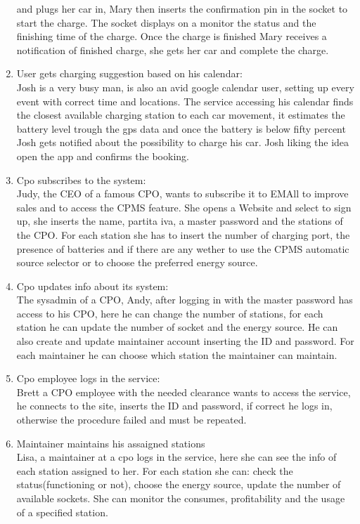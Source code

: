 \begin{enumerate}[label=S\arabic*]
            and plugs her car in, Mary then inserts the confirmation pin in the socket to start the charge.
            The socket displays on a monitor the status and the finishing time of the charge.
            Once the charge is finished Mary receives a notification of finished charge,
            she gets her car and complete the charge.
      \item User gets charging suggestion based on his calendar:\\
            Josh is a very busy man, is also an avid google calendar user,
            setting up every event with correct time and locations.
            The service accessing his calendar finds the closest available charging station to each car movement,
            it estimates the battery level trough the gps data and once the battery is below fifty percent Josh gets notified
            about the possibility to charge his car.
            Josh liking the idea open the app and confirms the booking.
      \item Cpo subscribes to the system:\\
            Judy, the CEO of a famous CPO, wants to subscribe it to EMAll to improve sales and to access the CPMS feature.
            She opens a Website and select to sign up, she inserts the name, partita iva, a master password and the stations of the CPO.
            For each station she has to insert the number of charging port, the presence of batteries and if there are any
            wether to use the CPMS automatic source selector or to choose the preferred energy source.
      \item Cpo updates info about its system:\\
            The sysadmin of a CPO, Andy, after logging in with the master password has access to his CPO,
            here he can change the number of stations, for each station he can update the number of socket and the energy source.
            He can also create and update maintainer account inserting the ID and password. For each maintainer he can choose which station the maintainer can maintain.
      \item Cpo employee logs in the service:\\
            Brett a CPO employee with the needed clearance wants to access the service, he connects to the site, inserts the ID
            and password, if correct he logs in, otherwise the procedure failed and must be repeated.
      \item Maintainer maintains his assaigned stations\\
            Lisa, a maintainer at a cpo logs in the service, here she can see the info of each station assigned to her.
            For each station she can: check the status(functioning or not), choose the energy source, update the number of available sockets.
            She can monitor the consumes, profitability and the usage of a specified station.
\end{enumerate}

